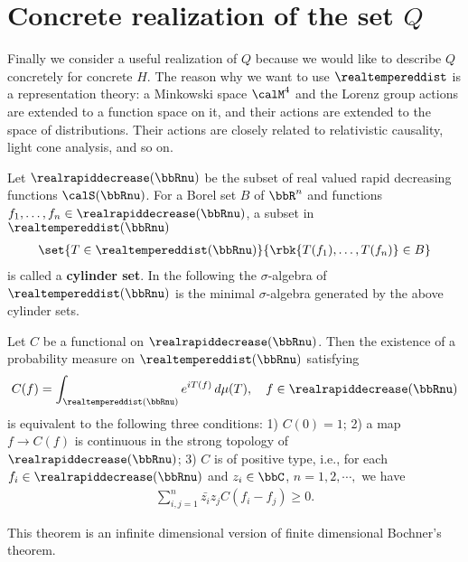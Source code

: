 \documentclass[openany, a4paper, oneside]{jsbook}
\begin{document}
\section{Concrete realization of the set $Q$}

Finally we consider a useful realization of $Q$ because we would like to describe $Q$ concretely for concrete $H$.
The reason why we want to use $\realtempereddist$ is a representation theory:
a Minkowski space $\calM^4$ and the Lorenz group actions are extended to a function space on it,
and their actions are extended to the space of distributions.
Their actions are closely related to relativistic causality, light cone analysis, and so on.

Let $\realrapiddecrease (\bbRnu)$ be the subset of real valued rapid decreasing functions $\calS (\bbRnu)$.
For a Borel set $B$ of $\bbR^n$ and functions $f_1, \dots, f_n \in \realrapiddecrease (\bbRnu)$,
a subset in $\realtempereddist (\bbRnu)$
\begin{align}
 \set{ T \in \realtempereddist (\bbRnu)}{\rbk{T (f_1), \dots, T (f_n)} \in B}
\end{align}
is called a \textbf{cylinder set}.
In the following the $\sigma$-algebra of $\realtempereddist (\bbRnu)$ is the minimal $\sigma$-algebra
generated by the above cylinder sets.

\begin{thm}
 Let $C$ be a functional on $\realrapiddecrease (\bbRnu)$.
 Then the existence of a probability measure on $\realtempereddist (\bbRnu)$ satisfying
 \begin{align}
  C (f)
  =
  \int_{\realtempereddist (\bbRnu)} e^{i T (f)} \, d \mu (T), \quad f \in \realrapiddecrease (\bbRnu)
 \end{align}
 is equivalent to the following three conditions:
 1) $C (0) = 1$;
 2) a map $f \to C (f)$ is continuous in the strong topology of $\realrapiddecrease (\bbRnu)$;
 3) $C$ is of positive type, i.e., for each $f_i \in \realrapiddecrease (\bbRnu)$ and $z_i \in \bbC$, $n=1,2,\cdots,$ we have
    \begin{align}
     \sum_{i,j = 1}^{n} \bar{z_i} z_j C (f_i - f_j) \geq 0.
    \end{align}
\end{thm}
\begin{rem}
 This theorem is an infinite dimensional version of finite dimensional Bochner's theorem.
\end{rem}
\end{document}
